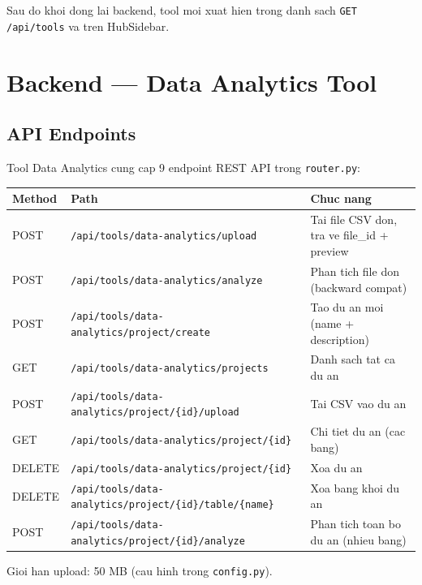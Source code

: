 \documentclass[12pt,a4paper]{article}
\begin{document}


Sau do khoi dong lai backend, tool moi xuat hien trong danh sach
\texttt{GET /api/tools} va tren HubSidebar.

\section{Backend --- Data Analytics Tool}

\subsection{API Endpoints}

Tool Data Analytics cung cap 9 endpoint REST API trong
\texttt{router.py}:

\begin{tabularx}{\textwidth}{lXl}
\toprule
\bfseries Method & \bfseries Path & \bfseries Chuc nang \\
\midrule
POST & \texttt{/api/tools/data-analytics/upload}
      & Tai file CSV don, tra ve file\_id + preview \\
POST & \texttt{/api/tools/data-analytics/analyze}
      & Phan tich file don (backward compat) \\
POST & \texttt{/api/tools/data-analytics/project/create}
      & Tao du an moi (name + description) \\
GET  & \texttt{/api/tools/data-analytics/projects}
      & Danh sach tat ca du an \\
POST & \texttt{/api/tools/data-analytics/project/\{id\}/upload}
      & Tai CSV vao du an \\
GET  & \texttt{/api/tools/data-analytics/project/\{id\}}
      & Chi tiet du an (cac bang) \\
DELETE & \texttt{/api/tools/data-analytics/project/\{id\}}
      & Xoa du an \\
DELETE & \texttt{/api/tools/data-analytics/project/\{id\}/table/\{name\}}
      & Xoa bang khoi du an \\
POST & \texttt{/api/tools/data-analytics/project/\{id\}/analyze}
      & Phan tich toan bo du an (nhieu bang) \\
\bottomrule
\end{tabularx}

Gioi han upload: 50 MB (cau hinh trong \texttt{config.py}).
\end{document}
